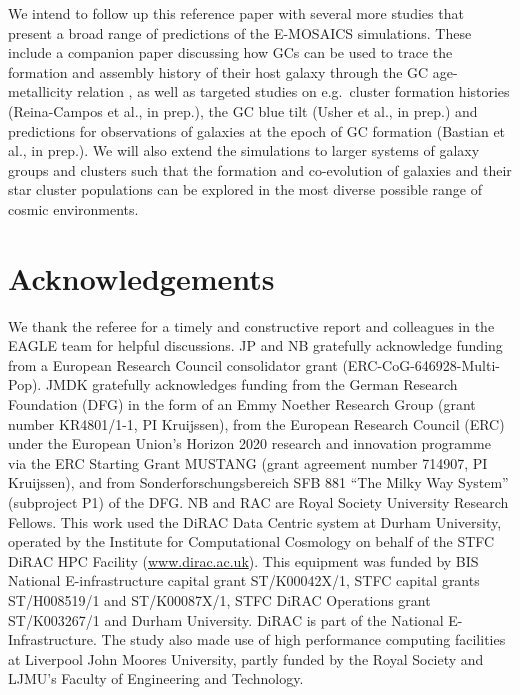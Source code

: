 \documentclass[fleqn,usenatbib]{mnras}
\begin{document}
We intend to follow up this reference paper with several more studies that present a broad range of predictions of the E-MOSAICS simulations. These include a companion paper discussing how GCs can be used to trace the formation and assembly history of their host galaxy through the GC age-metallicity relation \citep{Kruijssen_et_al_18}, as well as targeted studies on e.g.~cluster formation histories (Reina-Campos et al., in prep.), the GC blue tilt (Usher et al., in prep.) and predictions for observations of galaxies at the epoch of GC formation (Bastian et al., in prep.). We will also extend the simulations to larger systems of galaxy groups and clusters such that the formation and co-evolution of galaxies and their star cluster populations can be explored in the most diverse possible range of cosmic environments.

\section*{Acknowledgements}
We thank the referee for a timely and constructive report and colleagues in the EAGLE team for helpful discussions.
JP and NB gratefully acknowledge funding from a European Research Council consolidator grant (ERC-CoG-646928-Multi-Pop). JMDK gratefully acknowledges funding from the German Research Foundation (DFG) in the form of an Emmy Noether Research Group (grant number KR4801/1-1, PI Kruijssen), from the European Research Council (ERC) under the European Union's Horizon 2020 research and innovation programme via the ERC Starting Grant MUSTANG (grant agreement number 714907, PI Kruijssen), and from Sonderforschungsbereich SFB 881 ``The Milky Way System'' (subproject P1) of the DFG. NB and RAC are Royal Society University Research Fellows.  
This work used the DiRAC Data Centric system at Durham University, operated by the Institute for Computational Cosmology on behalf of the STFC DiRAC HPC Facility (\url{www.dirac.ac.uk}). This equipment was funded by BIS National E-infrastructure capital grant ST/K00042X/1, STFC capital grants ST/H008519/1 and ST/K00087X/1, STFC DiRAC Operations grant ST/K003267/1 and Durham University. DiRAC is part of the National E-Infrastructure.
The study also made use of high performance computing facilities at Liverpool John Moores University, partly funded by the Royal Society and LJMU's Faculty of Engineering and Technology.



\end{document}

